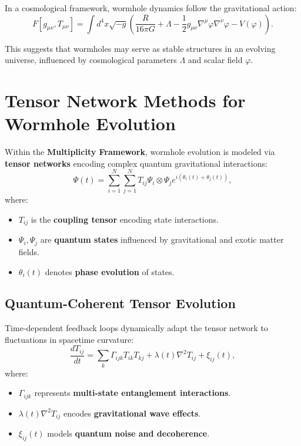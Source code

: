 \documentclass{article}
\theoremstyle{plain}
\begin{document}
In a cosmological framework, wormhole dynamics follow the gravitational action:
\begin{equation}
F [g_{\mu\nu}, T_{\mu\nu}] = \int d^4x \sqrt{-g} \left( \frac{R}{16\pi G} + \Lambda - \frac{1}{2} g_{\mu\nu} \nabla^\mu \varphi \nabla^\nu \varphi - V(\varphi) \right).
\end{equation}

This suggests that wormholes may serve as stable structures in an evolving universe, influenced by cosmological parameters $\Lambda$ and scalar field $\varphi$.

\section{Tensor Network Methods for Wormhole Evolution}
Within the \textbf{Multiplicity Framework}, wormhole evolution is modeled via \textbf{tensor networks} encoding complex quantum gravitational interactions:
\begin{equation}
\Psi(t) = \sum_{i=1}^{N} \sum_{j=1}^{N} T_{ij} \Psi_i \otimes \Psi_j e^{i(\theta_i(t) + \theta_j(t))},
\end{equation}
where:
\begin{itemize}
    \item $T_{ij}$ is the \textbf{coupling tensor} encoding state interactions.
    \item $\Psi_i, \Psi_j$ are \textbf{quantum states} influenced by gravitational and exotic matter fields.
    \item $\theta_i(t)$ denotes \textbf{phase evolution} of states.
\end{itemize}

\subsection{Quantum-Coherent Tensor Evolution}
Time-dependent feedback loops dynamically adapt the tensor network to fluctuations in spacetime curvature:
\begin{equation}
\frac{d T_{ij}}{dt} = \sum_{k} \Gamma_{ijk} T_{ik} T_{kj} + \lambda(t) \nabla^2 T_{ij} + \xi_{ij}(t),
\end{equation}
where:
\begin{itemize}
    \item $\Gamma_{ijk}$ represents \textbf{multi-state entanglement interactions}.
    \item $\lambda(t) \nabla^2 T_{ij}$ encodes \textbf{gravitational wave effects}.
    \item $\xi_{ij}(t)$ models \textbf{quantum noise and decoherence}.
\end{itemize}
\end{document}
